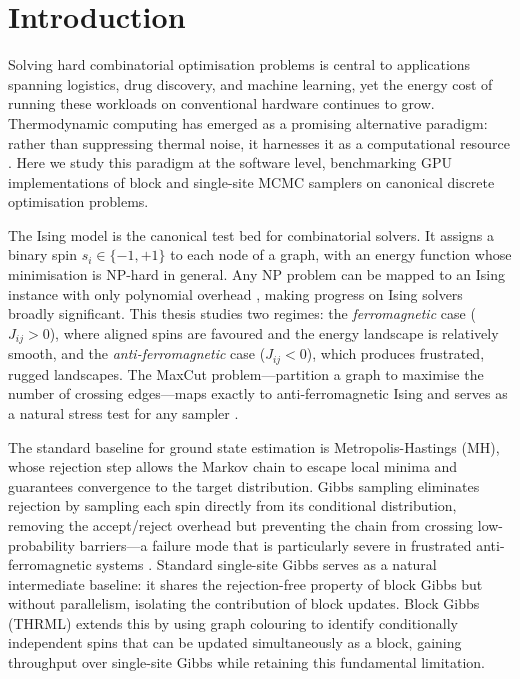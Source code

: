 \documentclass[conference]{IEEEtran}
\begin{document}
\section{Introduction}\label{sec:introduction}

Solving hard combinatorial optimisation problems is central to applications spanning logistics, drug discovery, and machine learning, yet the energy cost of running these workloads on conventional hardware continues to grow. Thermodynamic computing has emerged as a promising alternative paradigm: rather than suppressing thermal noise, it harnesses it as a computational resource \cite{jelincic2025, melanson2025}. Here we study this paradigm at the software level, benchmarking GPU implementations of block and single-site MCMC samplers on canonical discrete optimisation problems.

The Ising model is the canonical test bed for combinatorial solvers. It assigns a binary spin $s_i \in \{-1, +1\}$ to each node of a graph, with an energy function whose minimisation is NP-hard in general. Any NP problem can be mapped to an Ising instance with only polynomial overhead \cite{mcmahon2022}, making progress on Ising solvers broadly significant. This thesis studies two regimes: the \textit{ferromagnetic} case ($J_{ij} > 0$), where aligned spins are favoured and the energy landscape is relatively smooth, and the \textit{anti-ferromagnetic} case ($J_{ij} < 0$), which produces frustrated, rugged landscapes. The MaxCut problem---partition a graph to maximise the number of crossing edges---maps exactly to anti-ferromagnetic Ising and serves as a natural stress test for any sampler \cite{goemans1995}.

The standard baseline for ground state estimation is Metropolis-Hastings (MH), whose rejection step allows the Markov chain to escape local minima and guarantees convergence to the target distribution. Gibbs sampling eliminates rejection by sampling each spin directly from its conditional distribution, removing the accept/reject overhead but preventing the chain from crossing low-probability barriers---a failure mode that is particularly severe in frustrated anti-ferromagnetic systems \cite{camuto2021}. Standard single-site Gibbs serves as a natural intermediate baseline: it shares the rejection-free property of block Gibbs but without parallelism, isolating the contribution of block updates. Block Gibbs (THRML) extends this by using graph colouring to identify conditionally independent spins that can be updated simultaneously as a block, gaining throughput over single-site Gibbs while retaining this fundamental limitation.
\end{document}
